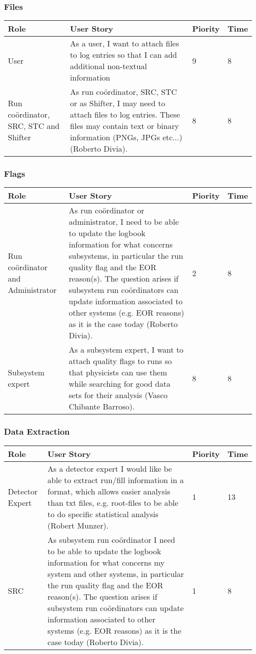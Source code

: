 \subsubsection{Files}
\begin{longtable}{ | p{2cm} | p{8cm} | p{1.5cm} | l |}
\hline
Role & User Story & Piority & Time \\ \hline
User &  As a user, I want to attach files to log entries so that I can add additional non-textual information & 9 & 8 \\ \hline
Run coördinator, SRC, STC and Shifter& As run coördinator, SRC, STC or as Shifter, I may need to attach files to log entries. These files may contain text or binary information (PNGs, JPGs etc...) (Roberto Divia). & 8 & 8 \\ \hline

\end{longtable}
\newpage
\subsubsection{Flags}
\begin{longtable}{ | p{2cm} | p{8cm} | p{1.5cm} | l |}
\hline
Role & User Story & Piority & Time \\ \hline
Run coördinator and Administrator &  As run coördinator or administrator, I need to be able to update the logbook information for what concerns subsystems, in particular the run quality flag and the EOR reason(s). The question arises if subsystem run coördinators can update information associated to other systems (e.g. EOR
reasons) as it is the case today (Roberto Divia). & 2 & 8 \\ \hline
Subsystem expert & As a subsystem expert, I want to attach quality flags to runs so that
physicists can use them while searching for good data sets for their analysis (Vasco Chibante Barroso). & 8 & 8 \\ \hline
\end{longtable}

\subsubsection{Data Extraction}
\begin{longtable}{ | p{2cm} | p{8cm} | p{1.5cm} | l |}
\hline
Role & User Story & Piority & Time \\ \hline
Detector Expert & As a detector expert I would like be able to extract run/fill information in a format, which allows easier analysis than txt files, e.g. root-files to be able to do specific statistical analysis (Robert Munzer). & 1 & 13 \\ \hline
SRC &  As subsystem run coördinator I need to be able to update the logbook information for what concerns my system and other systems, in particular the run quality flag and the EOR reason(s). The question arises if subsystem run coördinators can update information associated to other systems (e.g. EOR reasons) as it is the case today (Roberto Divia). & 1 & 8 \\ \hline

\end{longtable}
\newpage

